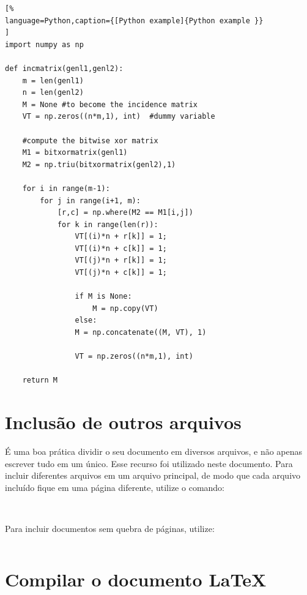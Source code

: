 \begin{lstlisting}[%
language=Python,caption={[Python example]{Python example }}
]
import numpy as np

def incmatrix(genl1,genl2):
    m = len(genl1)
    n = len(genl2)
    M = None #to become the incidence matrix
    VT = np.zeros((n*m,1), int)  #dummy variable

    #compute the bitwise xor matrix
    M1 = bitxormatrix(genl1)
    M2 = np.triu(bitxormatrix(genl2),1)

    for i in range(m-1):
        for j in range(i+1, m):
            [r,c] = np.where(M2 == M1[i,j])
            for k in range(len(r)):
                VT[(i)*n + r[k]] = 1;
                VT[(i)*n + c[k]] = 1;
                VT[(j)*n + r[k]] = 1;
                VT[(j)*n + c[k]] = 1;

                if M is None:
                    M = np.copy(VT)
                else:
                M = np.concatenate((M, VT), 1)

                VT = np.zeros((n*m,1), int)

    return M
\end{lstlisting}

\section{Inclusão de outros arquivos}%
\label{sec-include}

É uma boa prática dividir o seu documento em diversos arquivos, e não
apenas escrever tudo em um único. Esse recurso foi utilizado neste
documento. Para incluir diferentes arquivos em um arquivo principal,
de modo que cada arquivo incluído fique em uma página diferente, utilize o
comando:

\begin{lstlisting}[language=tex]
  
\end{lstlisting}

Para incluir documentos sem quebra de páginas, utilize:

\begin{lstlisting}[language=tex]
        % sem a extensão .tex
\end{lstlisting}

\section{Compilar o documento \LaTeX{}}


